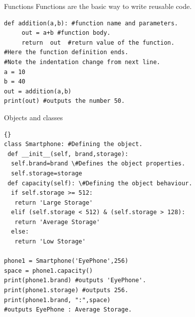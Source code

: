 \documentclass{beamer}
\begin{document}
\begin{frame}[fragile]{Functions}
Functions are the basic way to write reusable code.
\begin{lstlisting}
def addition(a,b): #function name and parameters.
     out = a+b #function body.
     return  out  #return value of the function.
#Here the function definition ends.
#Note the indentation change from next line.
a = 10
b = 40
out = addition(a,b)
print(out) #outputs the number 50. 
\end{lstlisting}

\end{frame}

\begin{frame}[fragile]{Objects and classes}

\begin{lstlisting}{}
class Smartphone: #Defining the object.
 def __init__(self, brand,storage):
  self.brand=brand \#Defines the object properties.
  self.storage=storage 
 def capacity(self): \#Defining the object behaviour.
  if self.storage >= 512:
   return 'Large Storage'
  elif (self.storage < 512) & (self.storage > 128):
   return 'Average Storage'
  else:
   return 'Low Storage'

phone1 = Smartphone('EyePhone',256)
space = phone1.capacity()
print(phone1.brand) #outputs 'EyePhone'.
print(phone1.storage) #outputs 256.
print(phone1.brand, ":",space) 
#outputs EyePhone : Average Storage.
\end{lstlisting}
\end{frame}
\end{document}
